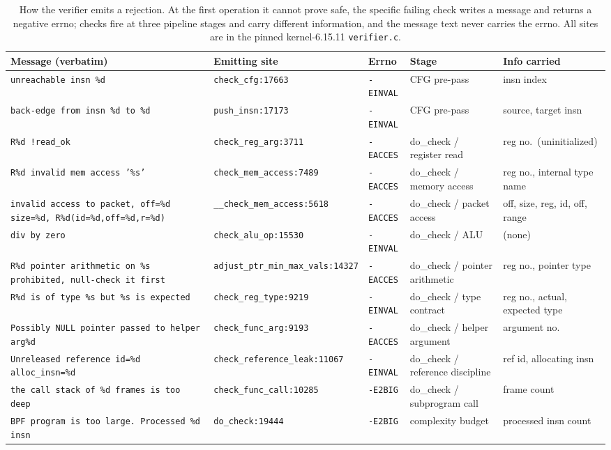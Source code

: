 \begin{table}[t]
  \centering
  \caption{How the verifier emits a rejection. At the first operation it cannot prove safe, the specific failing check writes a message and returns a negative errno; checks fire at three pipeline stages and carry different information, and the message text never carries the errno. All sites are in the pinned kernel-6.15.11 \texttt{verifier.c}.}
  \label{tab:emission}
  \scriptsize
  \setlength{\tabcolsep}{3pt}
  \begin{tabular}{@{}p{5.7cm} l l p{2.5cm} p{3.0cm}@{}}
    \toprule
    Message (verbatim) & Emitting site & Errno & Stage & Info carried \\
    \midrule
    \texttt{unreachable insn \%d} & \texttt{check\_cfg:17663} & \texttt{-EINVAL} & CFG pre-pass & insn index \\
    \texttt{back-edge from insn \%d to \%d} & \texttt{push\_insn:17173} & \texttt{-EINVAL} & CFG pre-pass & source, target insn \\
    \texttt{R\%d !read\_ok} & \texttt{check\_reg\_arg:3711} & \texttt{-EACCES} & do\_check / register read & reg no.\ (uninitialized) \\
    \texttt{R\%d invalid mem access '\%s'} & \texttt{check\_mem\_access:7489} & \texttt{-EACCES} & do\_check / memory access & reg no., internal type name \\
    \texttt{invalid access to packet, off=\%d size=\%d, R\%d(id=\%d,off=\%d,r=\%d)} & \texttt{\_\_check\_mem\_access:5618} & \texttt{-EACCES} & do\_check / packet access & off, size, reg, id, off, range \\
    \texttt{div by zero} & \texttt{check\_alu\_op:15530} & \texttt{-EINVAL} & do\_check / ALU & (none) \\
    \texttt{R\%d pointer arithmetic on \%s prohibited, null-check it first} & \texttt{adjust\_ptr\_min\_max\_vals:14327} & \texttt{-EACCES} & do\_check / pointer arithmetic & reg no., pointer type \\
    \texttt{R\%d is of type \%s but \%s is expected} & \texttt{check\_reg\_type:9219} & \texttt{-EINVAL} & do\_check / type contract & reg no., actual, expected type \\
    \texttt{Possibly NULL pointer passed to helper arg\%d} & \texttt{check\_func\_arg:9193} & \texttt{-EACCES} & do\_check / helper argument & argument no. \\
    \texttt{Unreleased reference id=\%d alloc\_insn=\%d} & \texttt{check\_reference\_leak:11067} & \texttt{-EINVAL} & do\_check / reference discipline & ref id, allocating insn \\
    \texttt{the call stack of \%d frames is too deep} & \texttt{check\_func\_call:10285} & \texttt{-E2BIG} & do\_check / subprogram call & frame count \\
    \texttt{BPF program is too large. Processed \%d insn} & \texttt{do\_check:19444} & \texttt{-E2BIG} & complexity budget & processed insn count \\
    \bottomrule
  \end{tabular}
\end{table}

